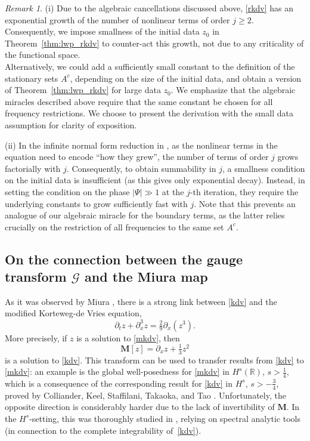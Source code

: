 \documentclass[a4paper,
11pt,  reqno]{amsart}
\newcommand{\5}{\textup{V}}
\newcommand{\noi}{\noindent}
\theoremstyle{remark}
\newtheorem{remark}[theorem]{Remark}
\newcommand{\R}{\mathbb{R}}
\newcommand{\MMb}{\mathbf{M}}
\newcommand{\Gc}{\mathcal{G}}
\numberwithin{equation}{section}
\numberwithin{theorem}{section}
\begin{document}
\begin{remark}
\rm

(i) Due to the  algebraic cancellations discussed above, \eqref{rkdv} has an exponential growth of the number of nonlinear terms of order $j\ge 2$. Consequently, we impose smallness of the initial data $z_0$ in Theorem~\ref{thm:lwp_rkdv} to counter-act this growth, not due to any criticality of the functional space.
\\
Alternatively, we could add a sufficiently small constant to the definition of the stationary sets $A^c$, depending on the size of the initial data, and obtain a version of Theorem~\ref{thm:lwp_rkdv} for large data $z_0$. We emphasize that the algebraic miracles described above require that the same constant be chosen for all frequency restrictions.
We choose to present the derivation with the small data assumption for clarity of exposition.


\smallskip
\noi
(ii) In the infinite normal form reduction in \cite{GuoKwonOh_nls, kishimoto}, as the nonlinear terms in the equation need to encode ``how they grew'', the number of terms of order $j$ grows factorially with $j$. Consequently, to obtain summability in $j$, a smallness condition on the initial data is insufficient (as this gives only exponential decay). Instead, in setting the condition on the phase $|\Psi| \gg 1$ at the $j$-th iteration, they require the underlying constants to grow sufficiently fast with $j$.
Note that this prevents an analogue of our algebraic miracle for the boundary terms, as the latter relies crucially on the restriction of all frequencies to the same set $A^c$.






\end{remark}


    \subsection{On the connection between the gauge transform $\Gc$ and the Miura map}
		As it was observed by Miura \cite{Miura}, there is a strong link between \eqref{kdv} and the modified Korteweg-de Vries equation,
		\begin{equation}
			\tag{mKdV}\label{mkdv}
			\partial_t z + \partial_x^3 z = \tfrac29 \partial_x(z^3).
		\end{equation}
		More precisely, if $z$ is a solution to \eqref{mkdv}, then
		\begin{equation}\label{eq:defiMiura}
			\MMb[z]=\partial_x z +\tfrac{1}{3}z^2
		\end{equation}
		is a solution to \eqref{kdv}. This transform can be used to transfer results from \eqref{kdv} to \eqref{mkdv}: an example is the global well-posedness for \eqref{mkdv} in $H^s(\R)$, $s>\frac14$, which is a consequence of the corresponding result for \eqref{kdv} in $H^s$, $s>-\frac34$, proved by Colliander, Keel, Staffilani, Takaoka, and Tao \cite{CKSTT_sharp_kdv}. Unfortunately, the opposite direction is considerably harder due to the lack of invertibility of $\MMb$. In the $H^s$-setting, this was thoroughly studied in  \cite{BuckmasterKoch, KPST_miura}, relying on spectral analytic tools (in connection to the complete integrability of~\eqref{kdv}).
\end{document}
